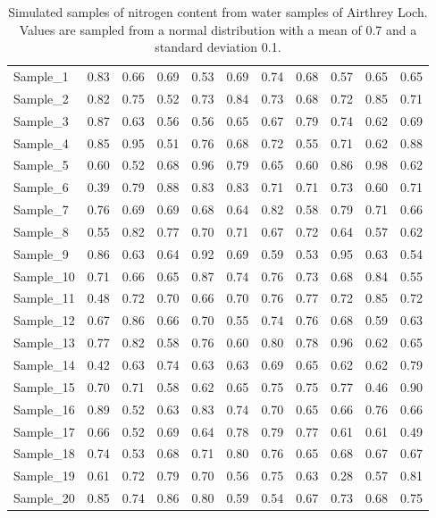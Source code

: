 \documentclass[
]{scrbook}
\begin{document}
\begin{longtable}[]{@{}lrrrrrrrrrr@{}}
\caption{\label{tab:unnamed-chunk-44}Simulated samples of nitrogen content from water samples of Airthrey Loch. Values are sampled from a normal distribution with a mean of 0.7 and a standard deviation 0.1.}\tabularnewline
\toprule
\endhead
Sample\_1 & 0.83 & 0.66 & 0.69 & 0.53 & 0.69 & 0.74 & 0.68 & 0.57 & 0.65 & 0.65 \\
Sample\_2 & 0.82 & 0.75 & 0.52 & 0.73 & 0.84 & 0.73 & 0.68 & 0.72 & 0.85 & 0.71 \\
Sample\_3 & 0.87 & 0.63 & 0.56 & 0.56 & 0.65 & 0.67 & 0.79 & 0.74 & 0.62 & 0.69 \\
Sample\_4 & 0.85 & 0.95 & 0.51 & 0.76 & 0.68 & 0.72 & 0.55 & 0.71 & 0.62 & 0.88 \\
Sample\_5 & 0.60 & 0.52 & 0.68 & 0.96 & 0.79 & 0.65 & 0.60 & 0.86 & 0.98 & 0.62 \\
Sample\_6 & 0.39 & 0.79 & 0.88 & 0.83 & 0.83 & 0.71 & 0.71 & 0.73 & 0.60 & 0.71 \\
Sample\_7 & 0.76 & 0.69 & 0.69 & 0.68 & 0.64 & 0.82 & 0.58 & 0.79 & 0.71 & 0.66 \\
Sample\_8 & 0.55 & 0.82 & 0.77 & 0.70 & 0.71 & 0.67 & 0.72 & 0.64 & 0.57 & 0.62 \\
Sample\_9 & 0.86 & 0.63 & 0.64 & 0.92 & 0.69 & 0.59 & 0.53 & 0.95 & 0.63 & 0.54 \\
Sample\_10 & 0.71 & 0.66 & 0.65 & 0.87 & 0.74 & 0.76 & 0.73 & 0.68 & 0.84 & 0.55 \\
Sample\_11 & 0.48 & 0.72 & 0.70 & 0.66 & 0.70 & 0.76 & 0.77 & 0.72 & 0.85 & 0.72 \\
Sample\_12 & 0.67 & 0.86 & 0.66 & 0.70 & 0.55 & 0.74 & 0.76 & 0.68 & 0.59 & 0.63 \\
Sample\_13 & 0.77 & 0.82 & 0.58 & 0.76 & 0.60 & 0.80 & 0.78 & 0.96 & 0.62 & 0.65 \\
Sample\_14 & 0.42 & 0.63 & 0.74 & 0.63 & 0.63 & 0.69 & 0.65 & 0.62 & 0.62 & 0.79 \\
Sample\_15 & 0.70 & 0.71 & 0.58 & 0.62 & 0.65 & 0.75 & 0.75 & 0.77 & 0.46 & 0.90 \\
Sample\_16 & 0.89 & 0.52 & 0.63 & 0.83 & 0.74 & 0.70 & 0.65 & 0.66 & 0.76 & 0.66 \\
Sample\_17 & 0.66 & 0.52 & 0.69 & 0.64 & 0.78 & 0.79 & 0.77 & 0.61 & 0.61 & 0.49 \\
Sample\_18 & 0.74 & 0.53 & 0.68 & 0.71 & 0.80 & 0.76 & 0.65 & 0.68 & 0.67 & 0.67 \\
Sample\_19 & 0.61 & 0.72 & 0.79 & 0.70 & 0.56 & 0.75 & 0.63 & 0.28 & 0.57 & 0.81 \\
Sample\_20 & 0.85 & 0.74 & 0.86 & 0.80 & 0.59 & 0.54 & 0.67 & 0.73 & 0.68 & 0.75 \\
\bottomrule
\end{longtable}
\end{document}
